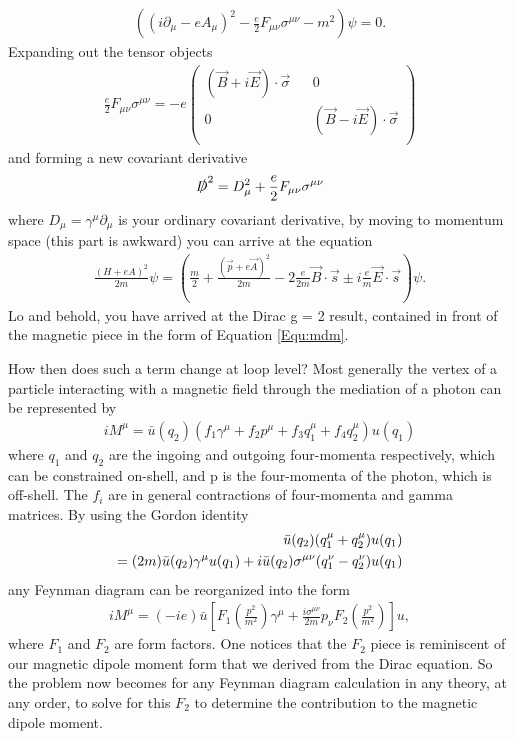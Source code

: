 	\begin{align}
		((i\partial_{\mu}-eA_{\mu})^{2} - \frac{e}{2} F_{\mu\nu}\sigma^{\mu\nu} - m^{2})\psi = 0.
	\end{align}
Expanding out the tensor objects
	\begin{align}
		\frac{e}{2} F_{\mu\nu}\sigma^{\mu\nu} = -e
		\begin{pmatrix}
			(\vec{B} + i \vec{E})\cdot \vec{\sigma} && 0 \\
			0 && (\vec{B} - i \vec{E})\cdot \vec{\sigma} \\
		\end{pmatrix}
\end{align}
and forming a new covariant derivative
	\begin{align}
		\slashed{D}^{2} = D_{\mu}^{2} + \frac{e}{2} F_{\mu\nu}\sigma^{\mu\nu}
	\end{align}
where $D_{\mu} = \gamma^{\mu}\partial_{\mu}$ is your ordinary covariant derivative, by moving to momentum space (this part is awkward) you can arrive at the equation
	\begin{align}
		\frac{(H+eA)^2}{2m}\psi = (\frac{m}{2} + \frac{(\vec{p}+e\vec{A})^{2}}{2m} -2 \frac{e}{2m}\vec{B}\cdot\vec{s} \pm i \frac{e}{m}\vec{E}\cdot\vec{s})\psi.
	\end{align}
Lo and behold, you have arrived at the Dirac g = 2 result, contained in front of the magnetic piece in the form of Equation \ref{Equ:mdm}.

How then does such a term change at loop level? Most generally the vertex of a particle interacting with a magnetic field through the mediation of a photon can be represented by 
	\begin{align}
		iM^{\mu} = \bar{u}(q_{2}) (f_{1}\gamma^{\mu} + f_{2}p^{\mu} + f_{3}q^{\mu}_{1} + f_{4}q^{\mu}_{2}) u(q_{1})
	\end{align}
where $q_{1}$ and $q_{2}$ are the ingoing and outgoing four-momenta respectively, which can be constrained on-shell, and p is the four-momenta of the photon, which is off-shell. The $f_{i}$ are in general contractions of four-momenta and gamma matrices. By using the Gordon identity
	\begin{align}
		\bar{u}(q_{2}) (q^{\mu}_{1} + q^{\mu}_{2}) u(q_{1}) \notag \\
		= (2m)\bar{u}(q_{2}) \gamma^{\mu}u(q_{1}) + i\bar{u}(q_{2})\sigma^{\mu\nu}(q^{\nu}_{1} - q^{\nu}_{2}) u(q_{1})
	\end{align}
any Feynman diagram can be reorganized into the form 
	\begin{align}
		iM^{\mu} = (-ie)\bar{u}[F_{1}(\frac{p^{2}}{m^2})\gamma^{\mu} + \frac{i\sigma^{\mu\nu}}{2m} p_{\nu}F_{2}(\frac{p^{2}}{m^2})]u,
	\end{align}
where $F_{1}$ and $F_{2}$ are form factors. One notices that the $F_{2}$ piece is reminiscent of our magnetic dipole moment form that we derived from the Dirac equation. So the problem now becomes for any Feynman diagram calculation in any theory, at any order, to solve for this $F_{2}$ to determine the contribution to the magnetic dipole moment.
